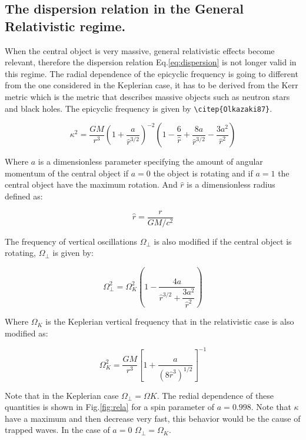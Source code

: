 \subsection*{The dispersion relation in the General Relativistic
regime.}

When the central object is very massive, general relativistic effects
become relevant, therefore the dispersion relation
Eq.\ref{eq:dispersion} is not longer valid in this regime. The radial
dependence of the epicyclic frequency is going to different from the
one considered in the Keplerian case, it has to be derived from the
Kerr metric which is the metric that describes massive objects such as
neutron stars and black holes. The epicyclic frequency is given by
\verb+\citep{Olkazaki87}+.

\begin{equation}
\kappa^2 = \dfrac{GM}{r^3}\left( 1 + \dfrac{a}{\hat{r}^{3/2}}
\right)^{-2} \left(1 - \dfrac{6}{\hat{r}} + \dfrac{8a}{\hat{r}^{3/2}}
- \dfrac{3a^2}{\hat{r}^2}  \right)
\end{equation}

Where $a$ is a dimensionless parameter specifying the amount of
angular momentum of the central object if $a=0$ the object is rotating
and if $a=1$ the central object have the maximum rotation. And
$\hat{r}$ is a dimensionless radius defined as:

\begin{equation}
\hat{r} = \dfrac{r}{GM/c^2}
\end{equation}

The frequency of vertical oscillations $\Omega_{\bot}$ is also modified
if the central object is rotating, $\Omega_{\bot}$ is given by:

\begin{equation}
\Omega_{\bot}^2 = \Omega_{K}^2 \left(1 - \dfrac{4a}{\hat{r}^{3/2} +
\dfrac{3a^2}{\hat{r}^2}} \right)
\end{equation}

Where $\Omega_K$ is the Keplerian vertical frequency that in the
relativistic case is also modified as:

\begin{equation}
\Omega_K^2 = \dfrac{GM}{r^3} \left[ 1 + \dfrac{a}{(8
\hat{r}^3)^{1/2}}\right]^{-1}
\end{equation}

Note that in the Keplerian case $\Omega_{\bot} = \Omega{K}$. The
redial dependence of these quantities is shown in Fig.\ref{fig:rela}
for a spin parameter of $a=0.998$. Note that $\kappa$ have a maximum
and then decrease very fast, this behavior would be the cause of
trapped waves. In the case of $a=0$ $\Omega_{\bot} = \Omega_K$.

